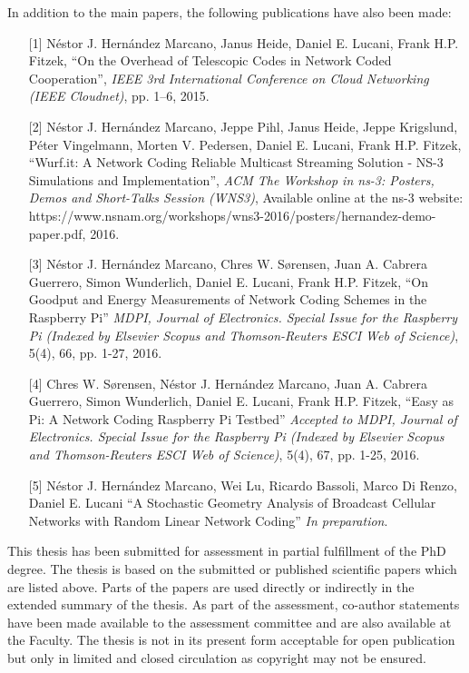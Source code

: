 \noindent In addition to the main papers, the following publications have also been made:
\begin{itemize}

  \item[{[1]}] N\'estor J. Hern\'andez Marcano, Janus Heide, Daniel E. Lucani, Frank H.P. Fitzek, ``On the Overhead of Telescopic Codes in Network Coded Cooperation'', \emph{IEEE 3rd International Conference on Cloud Networking (IEEE Cloudnet)}, pp. 1--6, 2015.

  \item[{[2]}] N\'estor J. Hern\'andez Marcano, Jeppe Pihl, Janus Heide, Jeppe Krigslund, P\'eter Vingelmann, Morten V. Pedersen, Daniel E. Lucani, Frank H.P. Fitzek, ``Wurf.it: A Network Coding Reliable Multicast Streaming Solution - NS-3 Simulations and Implementation'', \emph{ACM The Workshop in ns-3: Posters, Demos and Short-Talks Session (WNS3)}, Available online at the ns-3 website: https://www.nsnam.org/workshops/wns3-2016/posters/hernandez-demo-paper.pdf, 2016.

  \item[{[3]}] N\'estor J. Hern\'andez Marcano, Chres W. S\o rensen, Juan A. Cabrera Guerrero, Simon Wunderlich, Daniel E. Lucani, Frank H.P. Fitzek, ``On Goodput and Energy Measurements of Network Coding Schemes in the Raspberry Pi'' \emph{MDPI, Journal of Electronics. Special Issue for the Raspberry Pi (Indexed by Elsevier Scopus and Thomson-Reuters ESCI Web of Science)}, 5(4), 66, pp. 1-27, 2016.

  \item[{[4]}] Chres W. S\o rensen, N\'estor J. Hern\'andez Marcano, Juan A. Cabrera Guerrero, Simon Wunderlich, Daniel E. Lucani, Frank H.P. Fitzek, ``Easy as Pi: A Network Coding Raspberry Pi Testbed'' \emph{Accepted to MDPI, Journal of Electronics. Special Issue for the Raspberry Pi (Indexed by Elsevier Scopus and Thomson-Reuters ESCI Web of Science)}, 5(4), 67, pp. 1-25, 2016.

  \item[{[5]}] N\'estor J. Hern\'andez Marcano, Wei Lu, Ricardo Bassoli, Marco Di Renzo, Daniel E. Lucani ``A Stochastic Geometry Analysis of Broadcast Cellular Networks with Random Linear Network Coding'' \emph{In preparation}.

\end{itemize}

\noindent This thesis has been submitted for assessment in partial fulfillment of the PhD degree. The thesis is based on the submitted or published scientific papers which are listed above. Parts of the papers are used directly or indirectly in the extended summary of the thesis. As part of the assessment, co-author statements have been made available to the assessment committee and are also available at the Faculty. The thesis is not in its present form acceptable for open publication but only in limited and closed circulation as copyright may not be ensured.